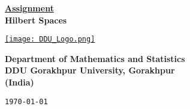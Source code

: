 \documentclass[12pt, a4paper]{article} %
\begin{document}
\begin{titlepage}
    \begin{center}
        \vspace*{1cm}
        \Large{\textbf{\underline{Assignment}}}\\ 
        \Large{\bf Hilbert Spaces}
        \vspace*{1cm}
        
        \href{ddugu.ac.in}{\texttt{[image: DDU\_Logo.png]}}

        \Large{\bf Department of Mathematics and Statistics}\\
        \Large{\bf DDU Gorakhpur University, Gorakhpur}\\
        \Large{\bf (India)}

        \vfill %

        {\tt \today}\\
    \end{center}
\end{titlepage}

\tableofcontents
\thispagestyle{empty}
\clearpage

\setcounter{page}{1}

\vspace*{1cm}
\end{document}
